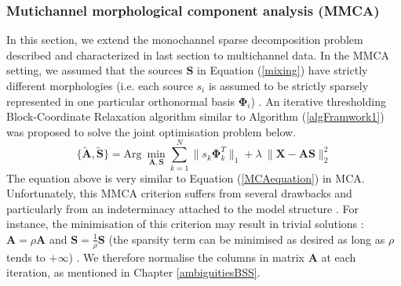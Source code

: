 \subsubsection{Mutichannel morphological component analysis (MMCA)}
In this section, we extend the monochannel sparse decomposition problem described and characterized in last section to multichannel data. In the MMCA setting, we assumed that the sources $\mathbf{S}$ in Equation (\ref{mixing}) have strictly different morphologies (i.e. each source $s_i$ is assumed to be strictly sparsely represented in one particular orthonormal basis $\mathbf{\Phi}_i$) \cite{BobinJ_2007SaMD}. An iterative thresholding Block-Coordinate Relaxation algorithm similar to Algorithm (\ref{algFramwork1}) was proposed to solve the joint optimisation problem below.
\begin{equation}
    \{\mathbf{\tilde{A},\tilde{S}}\} = \text{Arg} \: \min_{\mathbf{A},\mathbf{S}}\sum_{k=1}^N \lVert s_k \mathbf{\Phi}_k^T \rVert_{1} + \lambda \:\lVert \mathbf{X} - \mathbf{AS} \rVert^2_2
    \label{MMCAequation}
\end{equation}
The equation above is very similar to Equation (\ref{MCAequation}) in MCA. Unfortunately, this MMCA criterion suffers from several drawbacks and particularly from an indeterminacy attached to the model structure \cite{BobinJ_2007SaMD}. For instance, the minimisation of this criterion may result in trivial solutions : $\mathbf{A} = \rho \mathbf{A}$ and $\mathbf{S} = \frac{1}{\rho} \mathbf{S}$ (the sparsity term can be minimised as desired as long as $\rho$ tends to $+\infty$) \cite{BobinJ_2007SaMD}. We therefore normalise the columns in matrix $\mathbf{A}$ at each iteration, as mentioned in Chapter \ref{ambiguitiesBSS}.

